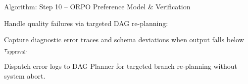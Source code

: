 \documentclass[aspectratio=169,10pt]{beamer}
\newenvironment{algolist}{%
  \begin{list}{}{%
    \setlength{\labelwidth}{1.9em}%
    \setlength{\leftmargin}{2.1em}%
    \setlength{\itemindent}{0pt}%
    \setlength{\labelsep}{0.45em}%
    \setlength{\itemsep}{0.28em}%
    \setlength{\parsep}{0pt}%
    \setlength{\topsep}{0.1em}%
    \renewcommand{\makelabel}[1]{\textbf{\color{lavenderDark}##1}}%
  }\small%
}{\end{list}}
\newenvironment{algosublist}{%
  \begin{list}{}{%
    \setlength{\labelwidth}{2.4em}%
    \setlength{\leftmargin}{2.8em}%
    \setlength{\itemindent}{0pt}%
    \setlength{\labelsep}{0.4em}%
    \setlength{\itemsep}{0.14em}%
    \setlength{\parsep}{0pt}%
    \setlength{\topsep}{0.1em}%
    \renewcommand{\makelabel}[1]{\textbf{\color{lavenderMedium}##1}}%
  }\small%
}{\end{list}}
\begin{document}
\begin{frame}[t]{Algorithm: Step 10 -- ORPO Preference Model \& Verification}
\begin{algolist}
\begin{algosublist}
    \end{algosublist}
  \item[10.3] Handle quality failures via targeted DAG re-planning:
    \begin{algosublist}
      \item[10.3.1] Capture diagnostic error traces and schema deviations when output falls below $\tau_{\mathrm{approval}}$.
      \item[10.3.2] Dispatch error logs to DAG Planner for targeted branch re-planning without system abort.
    \end{algosublist}
\end{algolist}
\end{frame}
\end{document}
